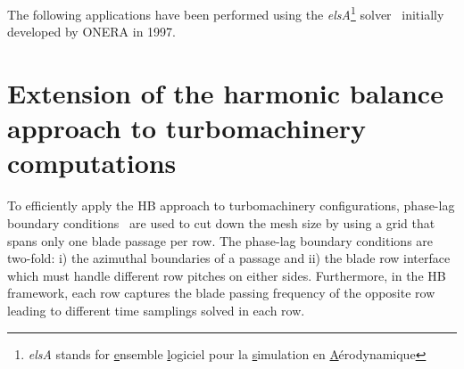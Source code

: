 
\label{app:elsa}

The following applications have been performed using the
\emph{elsA}\footnote{\emph{elsA} stands for \underline{e}nsemble 
\underline{l}ogiciel pour la \underline{s}imulation en 
\underline{A}\'erodynamique} solver~\cite{Cambier2013} initially developed by ONERA in 1997.


\section{Extension of the harmonic balance approach to
  turbomachinery computations}
\label{sec:turbomachinery_adaptation}

To efficiently apply the HB approach to turbomachinery
configurations, phase-lag boundary conditions~\cite{Erdos1977} are
used to cut down the mesh size by using a grid that spans only one
blade passage per row. The phase-lag boundary conditions are two-fold:
i) the azimuthal boundaries of a passage and ii) the blade row
interface which must handle different row pitches on either
sides. Furthermore, in the HB framework, each row captures the blade
passing frequency of the opposite row leading to different time
samplings solved in each row.

